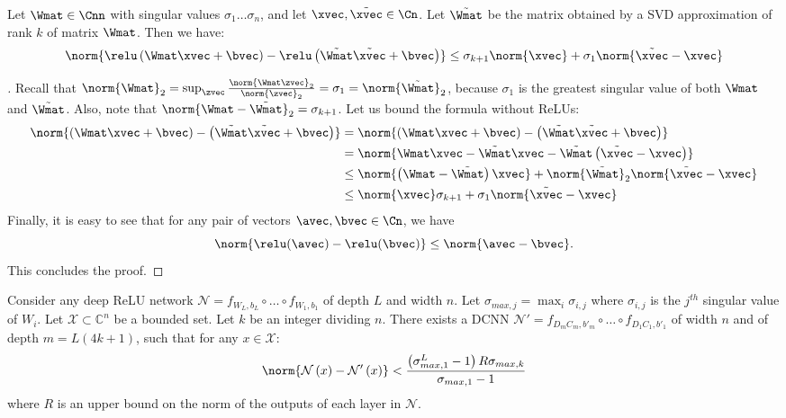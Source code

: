 \begin{lemma} \label{lemma:bound_one_layer}
Let $\Wmat \in \Cnn$ with singular values $\sigma_{1} \ldots \sigma_{n}$, and let $\xvec,\tilde{\xvec} \in \Cn$.
Let $\tilde{\Wmat}$ be the matrix obtained by a SVD approximation of rank $k$ of matrix $\Wmat$.
Then we have:
\begin{equation}
  \norm{ \relu \left( \Wmat\xvec + \bvec \right) - \relu \left( \tilde{\Wmat}\tilde{\xvec}+\bvec\right)} \le \sigma_{k+1} \norm{\xvec} + \sigma_{1} \norm{\tilde{\xvec} - \xvec} 
\end{equation}
\end{lemma}

\begin{proof}[]
Recall that $\norm{\Wmat}_{2} = \sup_{\zvec} \frac{\norm{\Wmat\zvec}_2}{\norm{\zvec}_2 } = \sigma_{1} = \norm{\tilde{\Wmat}}_{2}$, because $\sigma_{1}$ is the greatest singular value of both $\Wmat$ and $\tilde{\Wmat}$. Also, note that $\norm{\Wmat - \tilde{\Wmat}}_{2} = \sigma_{k+1}$. Let us bound the formula without ReLUs:
\begin{align}
  \norm{\left(\Wmat\xvec+\bvec\right) - \left(\tilde{\Wmat}\tilde{\xvec}+\bvec\right)} &= \norm{\left(\Wmat\xvec+\bvec\right) - \left(\tilde{\Wmat}\tilde{\xvec}+\bvec\right)} \\
   &= \norm{\Wmat\xvec - \tilde{\Wmat}\xvec - \tilde{\Wmat}\left(\tilde{\xvec}-\xvec\right)} \\
   &\le \norm{\left(\Wmat - \tilde{\Wmat}\right)\xvec} + \norm{\tilde{\Wmat}}_{2} \norm{\tilde{\xvec} - \xvec} \\
   &\le \norm{\xvec} \sigma_{k+1} + \sigma_{1} \norm{\tilde{\xvec} - \xvec} 
\end{align}
Finally, it is easy to see that for any pair of vectors $\avec,\bvec \in \Cn$, we have
\begin{equation}
  \norm{ \relu(\avec) - \relu(\bvec)} \le \norm{\avec - \bvec}.
\end{equation}
This concludes the proof.
\end{proof}

\begin{corollary} \label{corollary:relu_to_circ}
Consider any deep ReLU network $\mathcal{N} = f_{W_{L},b_{L}} \circ \ldots \circ f_{W_{1},b_{1}}$ of depth $L$ and width $n$.
Let $\sigma_{max,j} = \max_{i} \sigma_{i,j}$ where $\sigma_{i,j}$ is the $j^{th}$ singular value of $W_{i}$.
Let $\mathcal{X} \subset \mathbb{C}^{n}$ be a bounded set.
Let $k$ be an integer dividing $n$.
There exists a DCNN $\mathcal{N}' = f_{D_{m}C_{m},b'_{m}} \circ \ldots \circ f_{D_{1}C_{1},b'_{1}}$ of width $n$ and of depth $m=L(4k+1)$, such that for any $x\in\mathcal{X}$:
\begin{equation}
  \norm{ \mathcal{N}\left(x\right) - \mathcal{N}'\left(x\right)} < \frac{\left(\sigma_{max,1}^{L}-1\right)R\sigma_{max,k}}{\sigma_{max,1}-1}
\end{equation}
where $R$ is an upper bound on the norm of the outputs of each layer in $\mathcal{N}$.
\end{corollary}

